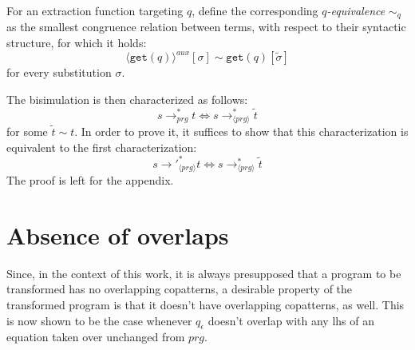 \begin{definition}[$q$-equivalence]
For an extraction function targeting $q$, define the corresponding \textit{$q$-equivalence} $\sim_q$ as the smallest congruence relation between terms, with respect to their syntactic structure, for which it holds:
\[
\langle \mathtt{get}(q) \rangle^{aux}[\sigma] \sim \mathtt{get}(q)[\widetilde{\sigma}]
\]
for every substitution $\sigma$.
\end{definition}

The bisimulation is then characterized as follows:
\[
s {\longrightarrow}_{prg}^* t \iff s \longrightarrow^*_{\langle prg \rangle} \widetilde{t}
\]
for some $\widetilde{t} \sim t$. In order to prove it, it suffices to show that this characterization is equivalent to the first characterization:
\begin{equation}
s {\longrightarrow'}_{\langle prg \rangle}^* t \iff s \longrightarrow^*_{\langle prg \rangle} \widetilde{t}
\end{equation}
 The proof is left for the appendix.

\section{Absence of overlaps}

Since, in the context of this work, it is always presupposed that a program to be transformed has no overlapping copatterns, a desirable property of the transformed program is that it doesn't have overlapping copatterns, as well. This is now shown to be the case whenever $q_\epsilon$ doesn't overlap with any lhs of an equation taken over unchanged from $prg$.

